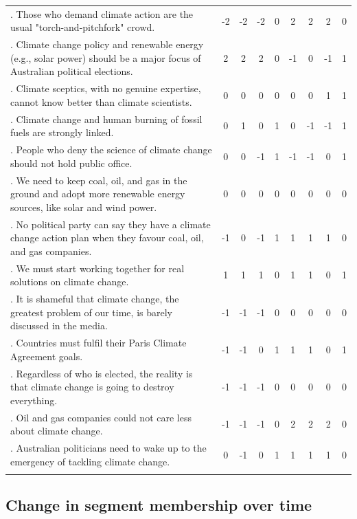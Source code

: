 \documentclass[
  letterpaper,
  DIV=11,
  numbers=noendperiod]{scrartcl}
\begin{document}
\begin{longtable}[t]{>{\raggedright\arraybackslash}p{12em}cccccccc}
18. Those who demand climate action are the usual "torch-and-pitchfork" crowd. & -2 & -2 & -2 & 0 & 2 & 2 & 2 & 0\\
19. Climate change policy and renewable energy (e.g., solar power) should be a major focus of Australian political elections. & 2 & 2 & 2 & 0 & -1 & 0 & -1 & 1\\
20. Climate sceptics, with no genuine expertise, cannot know better than climate scientists. & 0 & 0 & 0 & 0 & 0 & 0 & 1 & 1\\
21. Climate change and human burning of fossil fuels are strongly linked. & 0 & 1 & 0 & 1 & 0 & -1 & -1 & 1\\
22. People who deny the science of climate change should not hold public office. & 0 & 0 & -1 & 1 & -1 & -1 & 0 & 1\\
23. We need to keep coal, oil, and gas in the ground and adopt more renewable energy sources, like solar and wind power. & 0 & 0 & 0 & 0 & 0 & 0 & 0 & 0\\
24. No political party can say they have a climate change action plan when they favour coal, oil, and gas companies. & -1 & 0 & -1 & 1 & 1 & 1 & 1 & 0\\
25. We must start working together for real solutions on climate change. & 1 & 1 & 1 & 0 & 1 & 1 & 0 & 1\\
26. It is shameful that climate change, the greatest problem of our time, is barely discussed in the media. & -1 & -1 & -1 & 0 & 0 & 0 & 0 & 0\\
27. Countries must fulfil their Paris Climate Agreement goals. & -1 & -1 & 0 & 1 & 1 & 1 & 0 & 1\\
28. Regardless of who is elected, the reality is that climate change is going to destroy everything. & -1 & -1 & -1 & 0 & 0 & 0 & 0 & 0\\
29. Oil and gas companies could not care less about climate change. & -1 & -1 & -1 & 0 & 2 & 2 & 2 & 0\\
30. Australian politicians need to wake up to the emergency of tackling climate change. & 0 & -1 & 0 & 1 & 1 & 1 & 1 & 0\\*
\end{longtable}

\clearpage

\hypertarget{change-in-segment-membership-over-time}{%
\subsection{Change in segment membership over
time}\label{change-in-segment-membership-over-time}}
\end{document}
